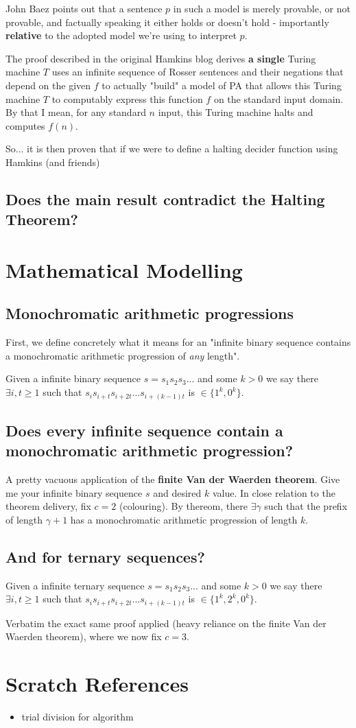 \documentclass{article}
\begin{document}
John Baez points out that a sentence $p$ in such a model is merely provable, or not provable, and factually speaking it either holds or doesn't hold - importantly \textbf{relative} to the adopted model we're using to interpret $p$.

The proof described in the original Hamkins blog derives \textbf{a single} Turing machine $T$ uses an infinite sequence of Rosser sentences and their negations that depend on the given $f$ to actually "build" a model of PA that allows this Turing machine $T$ to computably express this function $f$ on the standard input domain. By that I mean, for any standard $n$ input, this Turing machine halts and computes $f(n)$.

So... it is then proven that if we were to define a halting decider function using Hamkins (and friends)

\subsection{Does the main result contradict the Halting Theorem?}


\section{Mathematical Modelling}
\subsection{Monochromatic arithmetic progressions}
First, we define concretely what it means for an "infinite binary sequence contains a monochromatic arithmetic progression of \emph{any} length". 

Given a infinite binary sequence $s = s_{1}s_{2}s_{3}...$ and some $k>0$ we say there $\exists i,t \geq 1$ such that $s_{i}s_{i+t}s_{i+2t}...s_{i+(k-1)t}$ is $\in \{1^k,0^k\}$.

\subsection{Does every infinite sequence contain a monochromatic arithmetic progression?}
A pretty vacuous application of the \textbf{finite Van der Waerden theorem}. Give me your infinite binary sequence $s$ and desired $k$ value. In close relation to the theorem delivery, fix $c = 2$ (colouring). By thereom, there $\exists \gamma$ such that the prefix of length $\gamma + 1$ has a monochromatic arithmetic progression of length $k$.

\subsection{And for ternary sequences?} 
Given a infinite ternary sequence $s = s_{1}s_{2}s_{3}...$ and some $k>0$ we say there $\exists i,t \geq 1$ such that $s_{i}s_{i+t}s_{i+2t}...s_{i+(k-1)t}$ is $\in \{1^k,2^k,0^k\}$.

Verbatim the exact same proof applied (heavy reliance on the finite Van der Waerden theorem), where we now fix $c = 3$.

\section{Scratch References}
\begin{itemize}
	\item trial division for algorithm
\end{itemize}
\end{document}
